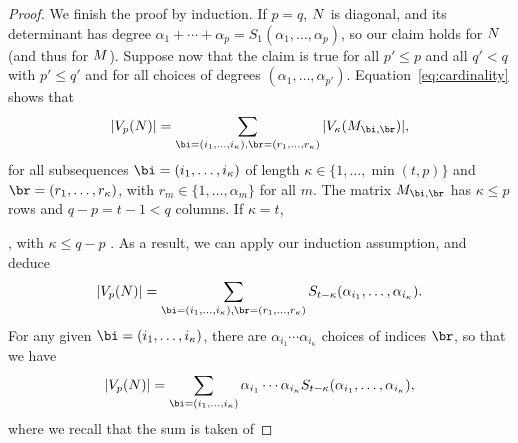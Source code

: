 \documentclass[12pt]{article}
\begin{document}
\begin{proof}
  We finish the proof by induction. If $p=q$, ${N}$ is diagonal, and
  its determinant has degree $\alpha_1 + \cdots + \alpha_p =
  S_1(\alpha_1,\dots,\alpha_p)$, so our claim holds for ${N}$ (and
  thus for ${M}$). Suppose now that the claim is true  for all $p'\le p$ and all $q' < q$ with $p'
  \le q'$ and for all choices
  of degrees $(\alpha_1,\dots,\alpha_{p'})$.
 Equation~\eqref{eq:cardinality} shows that 
$$
    |V_p(\mN)| = \sum_{\bi=(i_1,\dots,i_\kappa),\br=(r_1,\dots,r_\kappa)}  |V_\kappa(\mM_{\bi,\br})|,
$$
  for 
 all subsequences $\bi=(i_1,\dots,i_\kappa)$
  of length $\kappa \in \{1,\dots,\min(t,p)\}$ and $\br=(r_1,\dots,r_\kappa)$,
  with $r_m \in \{1,\dots,\alpha_m\}$ for all $m$. The matrix $\mM_{\bi,\br}$ has $\kappa \le p$ rows
  and $q-p = t-1 < q$ columns. If $\kappa=t$, 


, with $\kappa \le q-p$ . As a result, we 
  can apply our induction assumption, and deduce
  $$
  |V_p(\mN)| = \sum_{\bi=(i_1,\dots,i_\kappa),\br=(r_1,\dots,r_\kappa)}  S_{t-\kappa}(\alpha_{i_1},\dots,\alpha_{i_\kappa}).
  $$
  For any given $\bi=(i_1,\dots,i_\kappa)$, there are $\alpha_{i_1}\cdots \alpha_{i_\kappa}$ 
  choices of indices $\br$, so that we have
  $$
  |V_p(\mN)| = \sum_{\bi=(i_1,\dots,i_\kappa)} \alpha_{i_1}\cdots \alpha_{i_\kappa} S_{t-\kappa}(\alpha_{i_1},\dots,\alpha_{i_\kappa}),
  $$
  where we recall that the sum is taken of
\end{proof}









\end{document}
